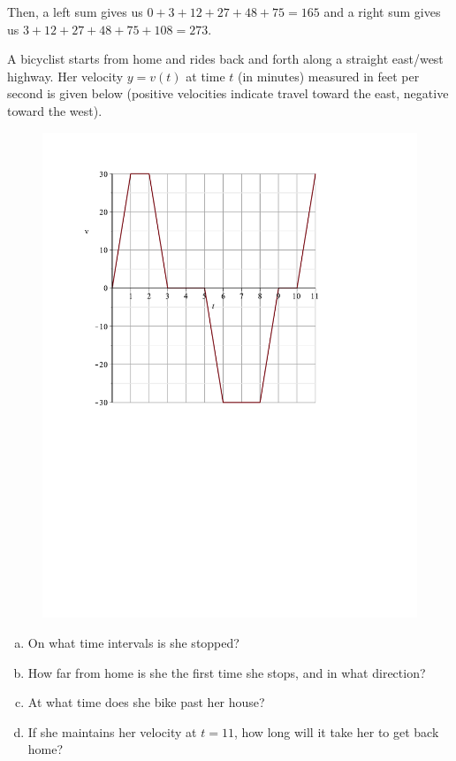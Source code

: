 \documentclass[11pt]{exam}
\begin{document}
\begin{questions}
\begin{solution}
\begin{enumerate}[(a)]
    Then, a left sum gives us \(0+3+12+27+48+75 = 165\) and a right
    sum gives us \(3+12+27+48+75+108 = 273\).
  \end{enumerate}
\end{solution}
\question A bicyclist starts from home and rides back and forth along a straight east/west highway. Her velocity $y=v(t)$ at time $t$ (in minutes) 
measured  in feet per second is given below (positive velocities indicate travel toward the east, negative toward the west).
\begin{figure}[tbh]
\centering
\includegraphics[scale=.5]{Figures/fig1.pdf}
\end{figure}
\begin{enumerate}[(a)]
	\item On what time intervals is she stopped?
	\item How far from home is she the first time she stops, and in what direction?
	\item At what time does she bike past her house?
	\item If she maintains her velocity at $t=11$, how long will it take her to get back home?

\end{enumerate}
\end{questions}
\end{document}
